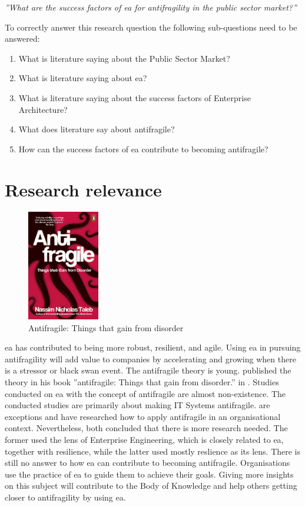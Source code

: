 \noindent \emph{''What are the success factors of \acrlong{ea} for \gls{antifragility} in the public sector market?''}\bigskip

\noindent To correctly answer this research question the following sub-questions need to be answered:

\begin{enumerate}
	\item{What is literature saying about the Public Sector Market?}
	\item{What is literature saying about \acrlong{ea}?}
	\item{What is literature saying about the success factors of Enterprise Architecture?}
	\item{What does literature say about antifragile?}
	\item{How can the success factors of \acrlong{ea} contribute to becoming antifragile?}
\end{enumerate}
\section{Research relevance}
\label{sec:researchrelevance}
\begin{figure}
	\centering
	\includegraphics[width=0.28\textwidth]{images/antifragilebookcover.jpg}
	\caption{Antifragile: Things that gain from disorder}
\end{figure}
\acrfull{ea} has contributed to being more \gls{robust}, \gls{resilient}, and \gls{agile}. Using \acrshort{ea} in pursuing \gls{antifragility} will add value to companies by accelerating and growing when there is a stressor or black swan event. The \gls{antifragile} theory is young.  \citeauthor{Taleb2012} published the theory in his book ''\Gls{antifragile}: Things that gain from disorder.'' in \citeyear{Taleb2012}.  Studies conducted on \acrshort{ea} with the concept of \gls{antifragile} are almost non-existence. The conducted studies are primarily about making IT Systems \gls{antifragile}. \textcite{Botjes2020,Kastner2017} are exceptions and have researched how to apply \gls{antifragile} in an organisational context. Nevertheless, both concluded that there is more research needed. The former used the lens of Enterprise Engineering, which is closely related to \acrshort{ea}, together with resilience, while the latter used mostly reslience as its lens. There is still no answer to how \acrshort{ea} can contribute to becoming \gls{antifragile}. Organisations use the practice of \acrshort{ea} to guide them to achieve their goals. Giving more insights on this subject will contribute to the Body of Knowledge and help others getting closer to \gls{antifragility} by using \acrshort{ea}.


